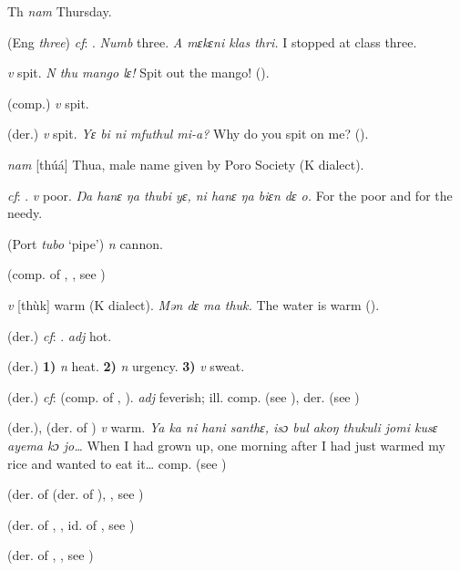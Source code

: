 \begin{letter}{Th}
 \textit{nam} Thursday.

 (Eng \textit{three}) \textit{cf}: . \textit{Numb} three. \textit{A mɛkɛni klas thri.} I stopped at class three.

 \textit{v} spit.\textit{ N thu mango lɛ!} Spit out the mango! (\citealt{Pichl1967}).

 (comp.) \textit{v} spit.

 (der.) \textit{v} spit. \textit{Yɛ bi ni mfuthul mi-a?} Why do you spit on me? (\citealt{Pichl1967}).

 \textit{nam} [thúá] Thua, male name given by Poro Society (K dialect). 

 \textit{cf}: . \textit{v} poor. \textit{Ŋa hanɛ ŋa thubi yɛ, ni hanɛ ŋa biɛn dɛ o.} For the poor and for the needy.

 (Port \textit{tubo} ‘pipe') \textit{n} cannon.

 (comp. of , , see ) 

 \textit{v} [thùk] warm (K dialect). \textit{Mən dɛ ma thuk.} The water is warm (\citealt{Pichl1967}). 

 (der.) \textit{cf}: . \textit{adj} hot.

 (der.) \textbf{1)} \textit{n} heat. \textbf{2)} \textit{n} urgency. \textbf{3)} \textit{v} sweat.

 (der.) \textit{cf}:  (comp. of , ). \textit{adj} feverish; ill. comp.  (see ), der.  (see )

 (der.), (der. of ) \textit{v} warm. \textit{Ya ka ni hani santhɛ, isɔ bul akoŋ thukuli jomi kusɛ ayema kɔ jo…} When I had grown up, one morning after I had just warmed my rice and wanted to eat it… comp.  (see )

 (der. of  (der. of ), , see )

 (der. of , , id. of , see ) 

 (der. of , , see )


\end{letter}
